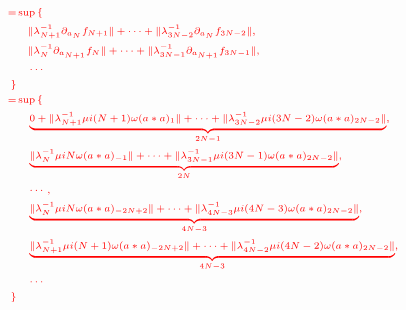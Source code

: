 \documentclass[11pt,a4paper,titlepage]{jsreport}
\theoremstyle{definition}
\providecommand{\DIFdel}[1]{{\protect\color{red} \scriptsize #1}} %
\begin{document}
\begin{enumerate}
\begin{displaymath}
  \DIFdel{\begin{split}
    =& \sup \left\{ \right. \\
    &\quad \|\lambda^{-1}_{N+1}\partial_{a_{N}} f_{N+1}\| + \cdots + \|\lambda^{-1}_{3N-2}\partial_{a_{N}} f_{3N-2}\|, \\
    &\quad \|\lambda^{-1}_{N} \partial_{a_{N+1}} f_{N}\| + \cdots + \|\lambda^{-1}_{3N-1}\partial_{a_{N+1}} f_{3N-1}\|,\\
    &\quad \cdots\\
    \left.\right\}\\
    =& \sup \left\{ \right. \\
    &\quad \underbrace{0+ \|\lambda^{-1}_{N+1} \mu i (N+1) \omega (a*a)_{1}\| + \cdots + \|\lambda^{-1}_{3N-2} \mu i (3N-2) \omega (a*a)_{2N-2}\|}_{2N-1}, \\
    &\quad \underbrace{\|\lambda^{-1}_{N}  \mu i N \omega (a*a)_{-1}\| + \cdots + \|\lambda^{-1}_{3N-1} \mu i (3N-1) \omega (a*a)_{2N-2}\|}_{2N},\\
    &\quad \cdots, \\
    &\quad \underbrace{\|\lambda^{-1}_{N}  \mu i N \omega (a*a)_{-2N+2}\| + \cdots + \|\lambda^{-1}_{4N-3} \mu i (4N-3) \omega (a*a)_{2N-2}\|}_{4N-3},\\
    &\quad \underbrace{\|\lambda^{-1}_{N+1}  \mu i (N+1) \omega (a*a)_{-2N+2}\| + \cdots + \|\lambda^{-1}_{4N-2} \mu i (4N-2) \omega (a*a)_{2N-2}\|}_{4N-3},\\
    &\quad \cdots \\
    \left.\right\}
  \end{split}
}\end{displaymath}%


\end{enumerate}
\end{document}
